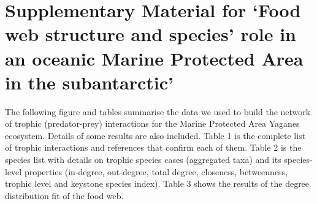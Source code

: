 \documentclass[
]{article}
\author{}
\date{\vspace{-2.5em}}
\begin{document}
\section{Supplementary Material for `Food web structure and species'
role in an oceanic Marine Protected Area in the
subantarctic'}\label{supplementary-material-for-food-web-structure-and-species-role-in-an-oceanic-marine-protected-area-in-the-subantarctic}

The following figure and tables summarise the data we used to build the
network of trophic (predator-prey) interactions for the Marine Protected
Area Yaganes ecosystem. Details of some results are also included. Table
1 is the complete list of trophic interactions and references that
confirm each of them. Table 2 is the species list with details on
trophic species cases (aggregated taxa) and its species-level properties
(in-degree, out-degree, total degree, closeness, betweenness, trophic
level and keystone species index). Table 3 shows the results of the
degree distribution fit of the food web.
\end{document}
